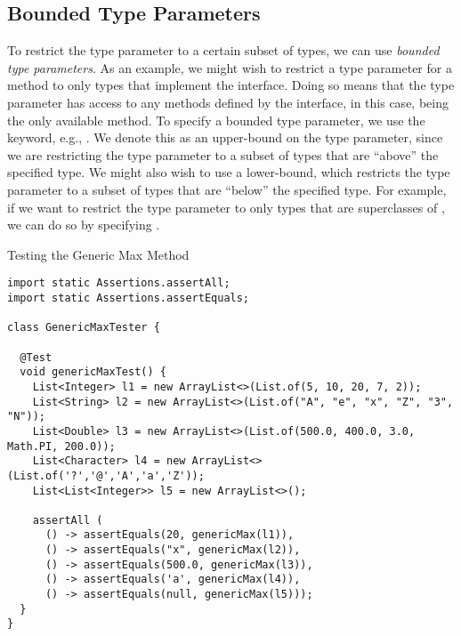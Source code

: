 \subsection*{Bounded Type Parameters}
To restrict the type parameter to a certain subset of types, we can use \textit{bounded type parameters}. As an example, we might wish to restrict a type parameter for a method to only types that implement the  interface. Doing so means that the type parameter has access to any methods defined by the interface, in this case,  being the only available method. To specify a bounded type parameter, we use the  keyword, e.g., . We denote this as an upper-bound on the type parameter, since we are restricting the type parameter to a subset of types that are ``above'' the specified type. We might also wish to use a lower-bound, which restricts the type parameter to a subset of types that are ``below'' the specified type. For example, if we want to restrict the type parameter to only types that are superclasses of , we can do so by specifying .


\begin{cl}[]{Testing the Generic Max Method}
\begin{lstlisting}[language=MyJava]
import static Assertions.assertAll;
import static Assertions.assertEquals;

class GenericMaxTester {
  
  @Test 
  void genericMaxTest() {
    List<Integer> l1 = new ArrayList<>(List.of(5, 10, 20, 7, 2));
    List<String> l2 = new ArrayList<>(List.of("A", "e", "x", "Z", "3", "N"));
    List<Double> l3 = new ArrayList<>(List.of(500.0, 400.0, 3.0, Math.PI, 200.0));
    List<Character> l4 = new ArrayList<>(List.of('?','@','A','a','Z'));
    List<List<Integer>> l5 = new ArrayList<>();

    assertAll (
      () -> assertEquals(20, genericMax(l1)),
      () -> assertEquals("x", genericMax(l2)),
      () -> assertEquals(500.0, genericMax(l3)),
      () -> assertEquals('a', genericMax(l4)),
      () -> assertEquals(null, genericMax(l5)));
  }
}
\end{lstlisting}
\end{cl}


